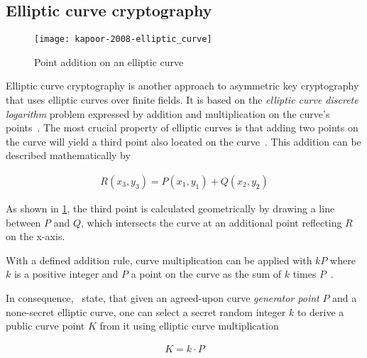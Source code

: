 \subsection{Elliptic curve cryptography}\label{subsec:elliptic-curve-cryptography}

\begin{figure}[H]
    \begin{center}
        \texttt{[image: kapoor-2008-elliptic\_curve]}
    \end{center}
    \caption[Point addition on an elliptic curve]{Point addition on an elliptic curve~\autocite[5]{kapoor_elliptic_2008}}
    \label{fig:elliptic-curve}
\end{figure}

Elliptic curve cryptography is another approach to asymmetric key cryptography that uses elliptic curves over finite fields.
It is based on the \emph{elliptic curve discrete logarithm} problem expressed by addition and multiplication on the curve's points~\autocites[65]{antonopoulos_mastering_2017}[5]{kapoor_elliptic_2008}.
The most crucial property of elliptic curves is that adding two points on the curve will yield a third point also located on the curve~\autocite[5]{kapoor_elliptic_2008}.
This addition can be described mathematically by

\begin{align}\label{eq:curve-addition}
    R(x_3,y_3)=P(x_1,y_1)+Q(x_2,y_2)
\end{align}

As shown in \cref{fig:elliptic-curve}, the third point is calculated geometrically by drawing a line between $P$ and $Q$, which intersects the curve at an additional point reflecting $R$ on the x-axis.

With a defined addition rule, curve multiplication can be applied with $kP$ where $k$ is a positive integer and $P$ a point on the curve as the sum of $k$ times $P$~\autocite[5]{kapoor_elliptic_2008}.

In consequence,~\textcites[65,68]{antonopoulos_mastering_2017}[5]{kapoor_elliptic_2008} state, that given an agreed-upon curve \emph{generator point} $P$ and a none-secret elliptic curve, one can select a secret random integer $k$ to derive a public curve point $K$ from it using elliptic curve multiplication

\begin{align}\label{eq:curve-multiplication}
    K=k \cdot P
\end{align}

